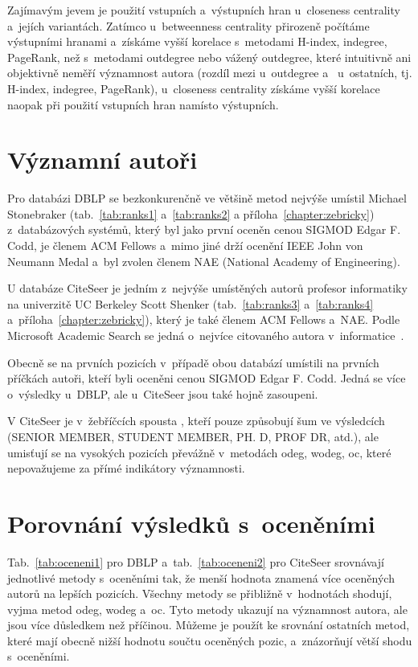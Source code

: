\documentclass{bakalarka}
\begin{document}
Zajímavým jevem je použití vstupních a~výstupních hran u~closeness centrality
a~jejích variantách. Zatímco u~betweenness centrality přirozeně počítáme
výstupními hranami a~získáme vyšší korelace s~metodami H-index, indegree,
PageRank, než s~metodami outdegree nebo vážený outdegree, které intuitivně ani
objektivně neměří významnost autora (rozdíl mezi  u~outdegree
a~ u~ostatních, tj. H-index, indegree, PageRank), u~closeness
centrality získáme vyšší korelace naopak při použití vstupních hran namísto
výstupních.

\section{Významní autoři}
Pro databázi DBLP se bezkonkurenčně ve většině metod nejvýše umístil Michael
Stonebraker (tab.~\ref{tab:ranks1} a~\ref{tab:ranks2} a
příloha~\ref{chapter:zebricky}) z~databázových systémů, který byl jako první
oceněn cenou SIGMOD Edgar F. Codd, je členem ACM Fellows a~mimo jiné drží
ocenění IEEE John von Neumann Medal a~byl zvolen členem NAE (National Academy
of Engineering).

U databáze CiteSeer je jedním z~nejvýše umístěných autorů profesor informatiky
na univerzitě UC Berkeley Scott Shenker (tab.~\ref{tab:ranks3}
a~\ref{tab:ranks4} a~příloha~\ref{chapter:zebricky}), který je také členem ACM
Fellows a~NAE. Podle Microsoft Academic Search se jedná o~nejvíce citovaného
autora v~informatice~\citep{mas}.

Obecně se na prvních pozicích v~případě obou databází umístili na prvních
příčkách autoři, kteří byli oceněni cenou SIGMOD Edgar F. Codd. Jedná se více
o~výsledky u~DBLP, ale u~CiteSeer jsou také hojně zasoupeni.

V CiteSeer je v~žebříčcích spousta , kteří pouze způsobují šum ve
výsledcích (SENIOR MEMBER, STUDENT MEMBER, PH. D, PROF DR, atd.), ale umisťují
se na vysokých pozicích převážně v~metodách odeg, wodeg, oc, které nepovažujeme
za přímé indikátory významnosti.

\section{Porovnání výsledků s~oceněními}
Tab.~\ref{tab:oceneni1} pro DBLP a~tab.~\ref{tab:oceneni2} pro CiteSeer
srovnávají jednotlivé metody s~oceněními tak, že menší hodnota znamená více
oceněných autorů na lepších pozicích. Všechny metody se přibližně v~hodnotách
shodují, vyjma metod odeg, wodeg a~oc. Tyto metody ukazují na významnost
autora, ale jsou více důsledkem než příčinou. Můžeme je použít ke srovnání
ostatních metod, které mají obecně nižší hodnotu součtu oceněných pozic,
a~znázorňují větší shodu s~oceněními.
\end{document}
